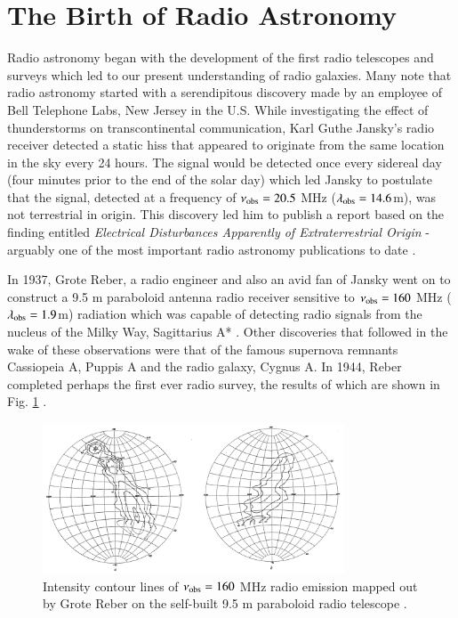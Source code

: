 \section{The Birth of Radio Astronomy}\label{section:early-radio-surveys}
Radio astronomy began with the development of the first radio telescopes and surveys which led to our present understanding of radio galaxies. Many note that radio astronomy started with a serendipitous discovery made by an employee of Bell Telephone Labs, New Jersey in the U.S. While investigating the effect of thunderstorms on transcontinental communication, Karl Guthe Jansky's radio receiver detected a static hiss that appeared to originate from the same location in the sky every 24 hours. The signal would be detected once every sidereal day (four minutes prior to the end of the solar day) which led Jansky to postulate that the signal, detected at a frequency of $\nu_{\rm obs} = 20.5$ MHz ($\lambda_{\rm obs} = 14.6$m), was not terrestrial in origin. This discovery led him to publish a report based on the finding entitled {\it Electrical Disturbances Apparently of Extraterrestrial Origin} - arguably one of the most important radio astronomy publications to date \citep{Jansky1933b,Jansky1933a}.

In 1937, Grote Reber, a radio engineer and also an avid fan of Jansky went on to construct a 9.5 m paraboloid antenna radio receiver sensitive to $\nu_{\rm obs} = 160$ MHz ($\lambda_{\rm obs} = 1.9$m) radiation which was capable of detecting radio signals from the nucleus of the Milky Way, Sagittarius A* \citep{Reber1940}. Other discoveries that followed in the wake of these observations were that of the famous supernova remnants Cassiopeia A, Puppis A and the radio galaxy, Cygnus A. In 1944, Reber completed perhaps the first ever radio survey, the results of which are shown in Fig. \ref{fig:Reber-map-sky-1944} \citep{Reber1944}. 

\begin{figure}[!ht]
     \centering
     \includegraphics[width=0.8\textwidth]{plots_chp1/Reber_radiomap_1944.png}
     \caption[160 MHz radio map from \citet{Reber1944}]{Intensity contour lines of $\nu_{\rm obs} = 160$ MHz radio emission mapped out by Grote Reber on the self-built 9.5 m paraboloid radio telescope \citep{Reber1944}.}
     \label{fig:Reber-map-sky-1944}
\end{figure}

